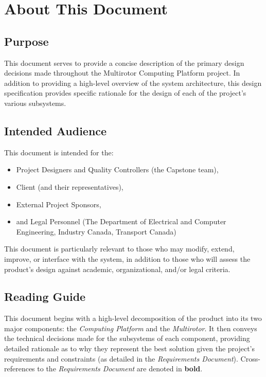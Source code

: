 \documentclass[10pt,letterpaper]{article}
\begin{document}


\section{About This Document}
\subsection{Purpose}
This document serves to provide a concise description of the primary design decisions made throughout the Multirotor Computing Platform project. In addition to providing a high-level overview of the system architecture, this design specification provides specific rationale for the design of each of the project's various subsystems.

\subsection{Intended Audience}
This document is intended for the:
\begin{itemize}
\item Project Designers and Quality Controllers (the Capstone team),
\item Client (and their representatives),
\item External Project Sponsors,
\item and Legal Personnel (The Department of Electrical and Computer Engineering, Industry Canada, Transport Canada)
\end{itemize}

This document is particularly relevant to those who may modify, extend, improve, or interface with the system, in addition to those who will assess the product's design against academic, organizational, and/or legal criteria.

\subsection{Reading Guide}

This document begins with a high-level decomposition of the product into its two major components: the \textit{Computing Platform} and the \textit{Multirotor}. It then conveys the technical decisions made for the subsystems of each component, providing detailed rationale as to why they represent the best solution given the project's requirements and constraints (as detailed in the \textit{Requirements Document}). Cross-references to the \textit{Requirements Document} are denoted in \textbf{bold}.
\end{document}
